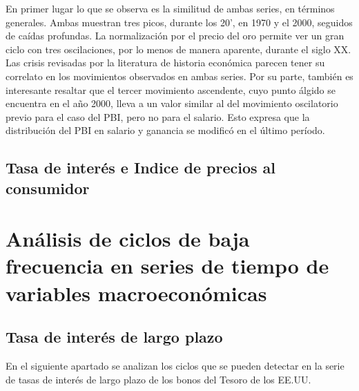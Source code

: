 \documentclass[a4paper]{article}
\begin{document}
En primer lugar lo que se observa es la similitud de ambas series, en términos generales. Ambas muestran tres picos, durante los 20', en 1970 y el 2000, seguidos de caídas profundas. La normalización por el precio del oro permite ver un gran ciclo con tres oscilaciones, por lo menos de manera aparente, durante el siglo XX. Las crisis revisadas por la literatura de historia económica parecen tener su correlato en los movimientos observados en ambas series. Por su parte, también es interesante resaltar que el tercer movimiento ascendente, cuyo punto álgido se encuentra en el año 2000, lleva a un valor similar al del movimiento oscilatorio previo para el caso del PBI, pero no para el salario. Esto expresa que la distribución del PBI en salario y ganancia se modificó en el último período. 


\subsection{Tasa de interés e Indice de precios al consumidor}


\section{Análisis de ciclos de baja frecuencia en series de tiempo de variables macroeconómicas}

\subsection{Tasa de interés de largo plazo}

En el siguiente apartado se analizan los ciclos que se pueden detectar en la serie de tasas de interés de largo plazo de los bonos del Tesoro de los EE.UU.
\end{document}
